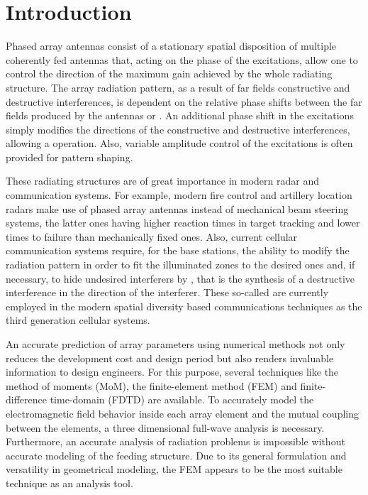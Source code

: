 \cleardoublepage
\renewcommand\thefigure{\arabic{figure}}
\pagestyle{myheadings}

{}
\chapter*{Introduction}

\par Phased array antennas consist of a stationary spatial disposition of multiple coherently fed antennas that, acting on the phase of the excitations, allow one to control the direction of the maximum gain achieved by the whole radiating structure. The array radiation pattern, as a result of far fields constructive and destructive interferences, is dependent on the relative phase shifts between the far fields produced by the antennas or . An additional phase shift in the excitations simply modifies the directions of the constructive and destructive interferences, allowing a  operation. Also, variable amplitude control of the excitations is often provided for pattern shaping. \cite{BalanisAT, StutzmanThieleATD, MilliganMAD, SelleriETA, MaillouxPAAH}

\par These radiating structures are of great importance in modern radar and communication systems. For example, modern fire control and artillery location radars make use of phased array antennas instead of mechanical beam steering systems, the latter ones having higher reaction times in target tracking and lower times to failure than mechanically fixed ones. Also, current cellular communication systems require, for the base stations, the ability to modify the radiation pattern in order to fit the illuminated zones to the desired ones and, if necessary, to hide undesired interferers by , that is the synthesis of a destructive interference in the direction of the interferer. These so-called  \cite{ZooghbySAE} are currently employed in the modern spatial diversity based communications techniques as the third generation cellular systems.

\par An accurate prediction of array parameters using numerical methods not only reduces the development cost and design period but also renders invaluable information to design engineers. For this purpose, several techniques like the method of moments (MoM), the finite-element method (FEM) and finite-difference time-domain (FDTD) are available. To accurately model the electromagnetic field behavior inside each array element and the mutual coupling between the elements, a three dimensional full-wave analysis is necessary. Furthermore, an accurate analysis of radiation problems is impossible without accurate modeling of the feeding structure. Due to its general formulation and versatility in geometrical modeling, the FEM appears to be the most suitable technique as an analysis tool.

